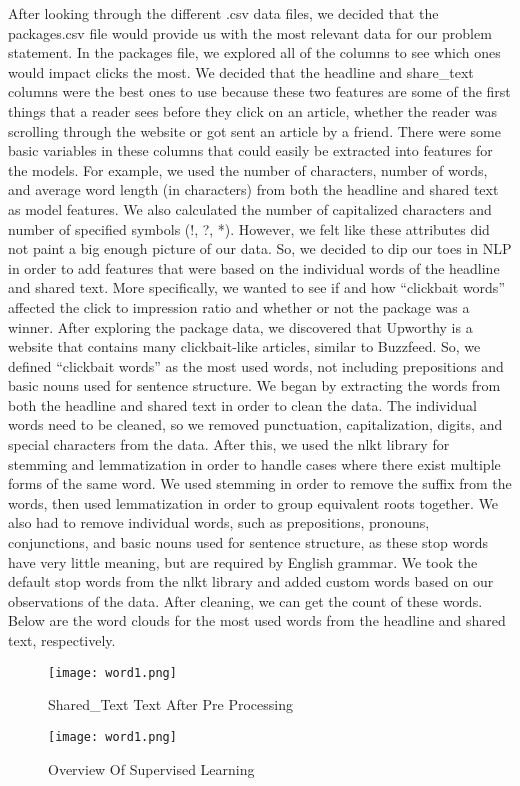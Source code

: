 \documentclass{article}
\begin{document}
\setlength{\parindent}{10pt}
After looking through the different .csv data files, we decided that the packages.csv file would provide us with the most relevant data for our problem statement. In the packages file, we explored all of the columns to see which ones would impact clicks the most. We decided that the headline and share\_text columns were the best ones to use because these two features are some of the first things that a reader sees before they click on an article, whether the reader was scrolling through the website or got sent an article by a friend.  There were some basic variables in these columns that could easily be extracted into features for the models. For example, we used the number of characters, number of words, and average word length (in characters) from both the headline and shared text as model features. We also calculated the number of capitalized characters and number of specified symbols (!,   ?, *).  However, we felt like these attributes did not paint a big enough picture of our data. So, we decided to dip our toes in NLP in order to add features that were based on the individual words of the headline and shared text. More specifically, we wanted to see if and how “clickbait words” affected the click to impression ratio and whether or not the package was a winner.  After exploring the package data, we discovered that Upworthy is a website that contains many clickbait-like articles, similar to Buzzfeed. So, we defined “clickbait words” as the most used words, not including prepositions and basic nouns used for sentence structure.  We began by extracting the words from both the headline and shared text in order to clean the data. The individual words need to be cleaned, so we removed punctuation, capitalization, digits, and special characters from the data. After this, we used the nlkt library for stemming and lemmatization in order to handle cases where there exist multiple forms of the same word. We used stemming in order to remove the suffix from the words, then used lemmatization in order to group equivalent roots together.  We also had to remove individual words, such as prepositions, pronouns, conjunctions, and basic nouns used for sentence structure, as these stop words have very little meaning, but are required by English grammar. We took the default stop words from the nlkt library and added custom words based on our observations of the data.  After cleaning, we can get the count of these words. Below are the word clouds for the most used words from the headline and shared text, respectively. \par
\begin{figure}[h]
\centering
\texttt{[image: word1.png]}
\caption{Shared\_Text Text After Pre Processing}
\end{figure} 
\begin{figure}[h]
\centering
\texttt{[image: word1.png]}
\caption{Overview Of Supervised Learning}
\end{figure} 
\end{document}

